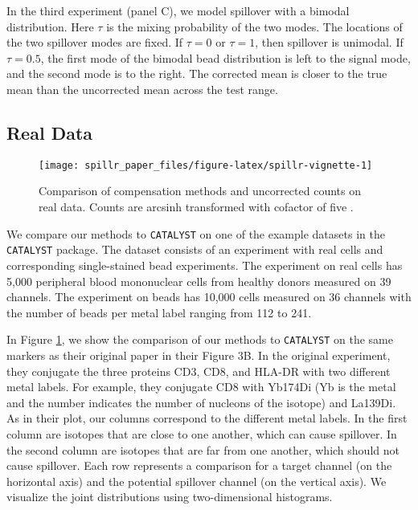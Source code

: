 \documentclass{bioinfo}
\begin{document}
In the third experiment (panel C), we model spillover with a bimodal
distribution. Here \(\tau\) is the mixing probability of the two modes.
The locations of the two spillover modes are fixed. If \(\tau = 0\) or
\(\tau = 1\), then spillover is unimodal. If \(\tau = 0.5\), the first
mode of the bimodal bead distribution is left to the signal mode, and
the second mode is to the right. The corrected mean is closer to the
true mean than the uncorrected mean across the test range.

\subsection{Real Data}

\label{real-data}

\begin{figure}

{\centering \texttt{[image: spillr\_paper\_files/figure-latex/spillr-vignette-1]} 

}

\caption{Comparison of compensation methods and uncorrected counts on real data. Counts are arcsinh transformed with cofactor of five \citep{bendall2011single}.}\label{fig:spillr-vignette}
\end{figure}

We compare our methods to \texttt{CATALYST} on one of the example
datasets in the \texttt{CATALYST} package. The dataset consists of an
experiment with real cells and corresponding single-stained bead
experiments. The experiment on real cells has 5,000 peripheral blood
mononuclear cells from healthy donors measured on 39 channels. The
experiment on beads has 10,000 cells measured on 36 channels with the
number of beads per metal label ranging from 112 to 241.

In Figure \ref{fig:spillr-vignette}, we show the comparison of our
methods to \texttt{CATALYST} on the same markers as their original paper
\citep{catalyst} in their Figure 3B. In the original experiment, they
conjugate the three proteins CD3, CD8, and HLA-DR with two different
metal labels. For example, they conjugate CD8 with Yb174Di (Yb is the
metal and the number indicates the number of nucleons of the isotope)
and La139Di. As in their plot, our columns correspond to the different
metal labels. In the first column are isotopes that are close to one
another, which can cause spillover. In the second column are isotopes
that are far from one another, which should not cause spillover. Each
row represents a comparison for a target channel (on the horizontal
axis) and the potential spillover channel (on the vertical axis). We
visualize the joint distributions using two-dimensional histograms.
\end{document}
